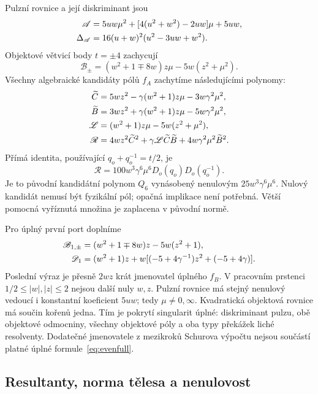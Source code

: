 \documentclass[11pt,a4paper]{article}
\theoremstyle{remark}\newtheorem{remark}[theorem]{Poznámka}
\numberwithin{equation}{section}
\begin{document}
Pulzní rovnice a její diskriminant jsou
\begin{align}
\mathscr A&=5uw\mu^2+[4(u^2+w^2)-2uw]\mu+5uw,\notag\\
\Delta_{\mathscr A}&=16(u+w)^2(u^2-3uw+w^2).
\label{eq:pulsepoly}
\end{align}
Objektové větvicí body \(t=\pm4\) zachycují
\begin{equation}
\mathscr B_\pm=(w^2+1\mp8w)z\mu-5w(z^2+\mu^2).
\label{eq:branchpolys}
\end{equation}
Všechny algebraické kandidáty pólů \(f_A\) zachytíme následujícími polynomy:
\begin{align}
\widetilde C&=5wz^2-\gamma(w^2+1)z\mu-3w\gamma^2\mu^2,\notag\\
\widetilde B&=3wz^2+\gamma(w^2+1)z\mu-5w\gamma^2\mu^2,\notag\\
\mathscr L&=(w^2+1)z\mu-5w(z^2+\mu^2),\notag\\
\mathscr R&=4wz^2\widetilde C^2+
\gamma\mathscr L\widetilde C\widetilde B+
4w\gamma^2\mu^2\widetilde B^2.
\label{eq:polepoly}
\end{align}
Přímá identita, používající \(q_o+q_o^{-1}=t/2\), je
\begin{equation}
\boxed{\mathscr R=100w^3\gamma^6\mu^6
D_o(q_o)D_o(q_o^{-1}).}
\label{eq:pole-norm}
\end{equation}
Je to původní kandidátní polynom \(Q_6\) vynásobený nenulovým \(25w^3\gamma^6\mu^6\). Nulový kandidát nemusí být fyzikální pól; opačná implikace není potřebná. Větší pomocná vyříznutá množina je zaplacena v původní normě.

Pro úplný první port doplníme
\begin{align}
\mathscr B_{1,\pm}&=(w^2+1\mp8w)z-5w(z^2+1),\notag\\
\mathscr D_1&=(w^2+1)z+
w[(-5+4\gamma^{-1})z^2+(-5+4\gamma)].
\label{eq:oddpolys}
\end{align}
Poslední výraz je přesně \(2wz\) krát jmenovatel úplného \(f_B\). V pracovním prstenci \(1/2\le|w|,|z|\le2\) nejsou další nuly \(w,z\). Pulzní rovnice má stejný nenulový vedoucí i konstantní koeficient \(5uw\); tedy \(\mu\ne0,\infty\). Kvadratická objektová rovnice má součin kořenů jedna. Tím je pokrytí singularit úplné: diskriminant pulzu, obě objektové odmocniny, všechny objektové póly a oba typy překážek liché resolventy. Dodatečné jmenovatele z mezikroků Schurova výpočtu nejsou součástí platné úplné formule~\eqref{eq:evenfull}.

\subsection{Resultanty, norma tělesa a nenulovost}
\end{document}
